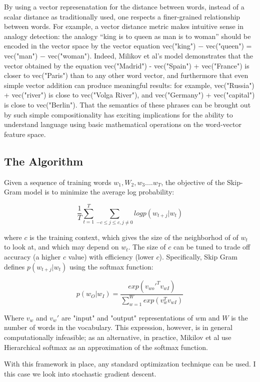 \documentclass[conference]{IEEEtran}
\begin{document}
By using a vector represenatation for the distance between words, instead of a scalar distance as traditionally used, one respects a finer-grained relationship between words. For example, a vector distance metric makes intuitive sense in analogy detection: the analogy “king is to queen as man is to woman” should be encoded in the vector space by the vector equation vec("king") − vec("queen") = vec("man") − vec("woman"). Indeed, Milikov et al's model demonstrates that the vector obtained by the equation vec("Madrid") - vec("Spain") + vec("France") is closer to vec("Paris") than to any other word vector, and furthermore that even simple vector addition can produce meaningful results: for example, vec("Russia") + vec("river") is close to vec("Volga River"), and vec("Germany") + vec("capital") is close to vec("Berlin"). That the semantics of these phrases can be brought out by such simple compositionality has exciting implications for the ability to understand language using basic mathematical operations on the word-vector feature space.

\subsection{The Algorithm}
Given a sequence of training words $w_1, W_2, w_3 .... w_T$, the objective of the Skip-Gram model is to minimize the average log probability:

$$\frac{1}{T} \sum_{t=1}^T \sum_{-c \leq j \leq c, j \neq 0} logp(w_{t+j}|w_t)$$

where $c$ is the training context, which gives the size of the neighborhod of of $w_t$ to look at, and which may depend on $w_t$. The size of $c$ can be tuned to trade off accuracy (a higher $c$ value) with efficiency (lower $c$). Specifically, Skip Gram defines $p(w_{t+j}|w_t)$ using the softmax function:

$$p(w_O|w_I) = \frac{exp(v_{wo}'^Tv_{wI})}{\sum_{w=1}^W exp(v_w^Tv_{wI})}$$

Where $v_w$ and $v_w'$ are "input" and "output" representations of $w$m and $W$ is the number of words in the vocabulary.  This expression, however, is in general computationally infeasible; as an alternative, in practice, Mikilov et al use Hierarchical softmax as an approximation of the softmax function.

With this framework in place, any standard optimization technique can be used. I this case we look into stochastic gradient descent.\\
\end{document}
